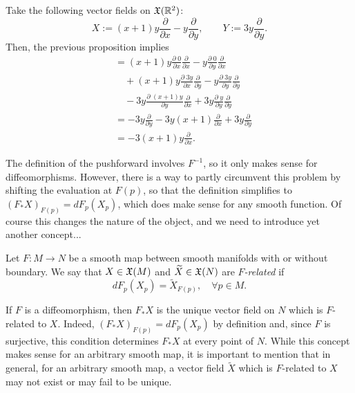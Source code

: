 \begin{example}
	Take the following vector fields on $\mathfrak{X}(\mathbb{R}^2)$:
	\begin{equation}
		X := (x+1)y \frac{\partial}{\partial x} - y \frac{\partial}{\partial y},\qquad
		Y := 3y \frac{\partial}{\partial y}.
	\end{equation}
	Then, the previous proposition implies
	\begin{align}
		[X,Y]
		 & = (x+1)y  \frac{\partial\; 0}{\partial x} \frac{\partial}{\partial x} - y \frac{\partial\; 0}{\partial y} \frac{\partial}{\partial x}         \\
		 & \quad + (x+1)y  \frac{\partial\; 3y}{\partial x} \frac{\partial}{\partial y} - y \frac{\partial\; 3y}{\partial y} \frac{\partial}{\partial y} \\
		 & \quad - 3y \frac{\partial\; (x+1)y}{\partial y} \frac{\partial}{\partial x} + 3y \frac{\partial\; y}{\partial y} \frac{\partial}{\partial y}  \\
		 & = - 3y \frac{\partial}{\partial y} -3 y(x+1) \frac{\partial}{\partial x} + 3y \frac{\partial}{\partial y}                                     \\
		 & = -3(x+1)y \frac{\partial}{\partial x}.
	\end{align}
\end{example}

The definition of the pushforward involves $F^{-1}$, so it only makes sense for diffeomorphisms.
However, there is a way to partly circumvent this problem by shifting the evaluation at $F(p)$, so that the definition simplifies to $(F_*X)_{F(p)} = dF_p(X_p)$, which does make sense for any smooth function.
Of course this changes the nature of the object, and we need to introduce yet another concept...

\begin{definition}\label{def:Frelated}
	Let $F:M\to N$ be a smooth map between smooth manifolds with or without boundary.
	We say that $X\in\mathfrak{X}(M)$ and $\widetilde X\in\mathfrak{X}(N)$ are \emph{$F$-related} if
	\begin{equation}
		dF_p(X_p) = \widetilde X_{F(p)}, \quad \forall p\in M.
	\end{equation}
\end{definition}

If $F$ is a diffeomorphism, then $F_*X$ is the unique vector field on $N$ which is $F$-related to $X$.
Indeed, $(F_*X)_{F(p)} = dF_p(X_p)$ by definition and, since $F$ is surjective, this condition determines $F_*X$ at every point of $N$.
While this concept makes sense for an arbitrary smooth map, it is important to mention that in general, for an arbitrary smooth map, a vector field $\widetilde X$ which is $F$-related to $X$ may not exist or may fail to be unique.

